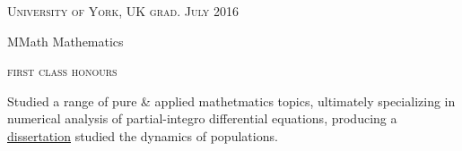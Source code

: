 {\raggedright
  \textsc{\small{University of York, UK
    \hfill
    {\raggedleft
      grad. July 2016
    }
  }}

  {\raggedright\large {
    MMath Mathematics
  } \\}

  \textsc{\small{first class honours}}

  \normalsize{
    Studied a range of pure \& applied mathetmatics topics, ultimately specializing in numerical analysis of partial-integro differential equations, producing a \href{https://github.com/LukeSheard/senior_thesis/releases/download/1.0.0/LukeSheard.pdf}{dissertation} studied the dynamics of populations. 
  }

  \vspace{8pt}
}
